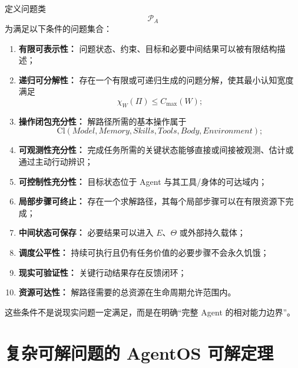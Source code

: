 定义问题类
\begin{equation}
\mathscr P_A
\end{equation}
为满足以下条件的问题集合：

\begin{enumerate}
    \item \textbf{有限可表示性：}
    问题状态、约束、目标和必要中间结果可以被有限结构描述；
    
    \item \textbf{递归可分解性：}
    存在一个有限或可递归生成的问题分解，使其最小认知宽度满足
    \begin{equation}
    \chi_W(\Pi)
    \leq
    C_{\max}(W);
    \end{equation}
    
    \item \textbf{操作闭包充分性：}
    解路径所需的基本操作属于
    \begin{equation}
    \mathrm{Cl}
    (
    Model,
    Memory,
    Skills,
    Tools,
    Body,
    Environment
    );
    \end{equation}
    
    \item \textbf{可观测性充分性：}
    完成任务所需的关键状态能够直接或间接被观测、估计或通过主动行动辨识；
    
    \item \textbf{可控制性充分性：}
    目标状态位于 Agent 与其工具/身体的可达域内；
    
    \item \textbf{局部步骤可终止：}
    存在一个求解路径，其每个局部步骤可以在有限资源下完成；
    
    \item \textbf{中间状态可保存：}
    必要结果可以进入 $E$、$\Theta$ 或外部持久载体；
    
    \item \textbf{调度公平性：}
    持续可执行且仍有任务价值的必要步骤不会永久饥饿；
    
    \item \textbf{现实可验证性：}
    关键行动结果存在反馈闭环；
    
    \item \textbf{资源可达性：}
    解路径需要的总资源在生命周期允许范围内。
\end{enumerate}

这些条件不是说现实问题一定满足，而是在明确“完整 Agent 的相对能力边界”。

\section{复杂可解问题的 AgentOS 可解定理}

